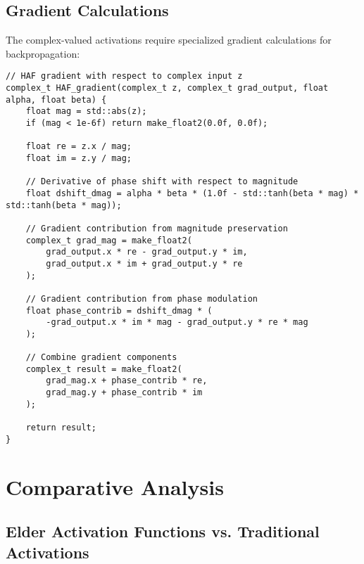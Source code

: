 \subsection{Gradient Calculations}

The complex-valued activations require specialized gradient calculations for backpropagation:

\begin{tcolorbox}[colback=CodeBackground, colframe=DarkGray, title=HAF Gradient Calculation, fonttitle=\bfseries]
\begin{verbatim}
// HAF gradient with respect to complex input z
complex_t HAF_gradient(complex_t z, complex_t grad_output, float alpha, float beta) {
    float mag = std::abs(z);
    if (mag < 1e-6f) return make_float2(0.0f, 0.0f);
    
    float re = z.x / mag;
    float im = z.y / mag;
    
    // Derivative of phase shift with respect to magnitude
    float dshift_dmag = alpha * beta * (1.0f - std::tanh(beta * mag) * std::tanh(beta * mag));
    
    // Gradient contribution from magnitude preservation
    complex_t grad_mag = make_float2(
        grad_output.x * re - grad_output.y * im,
        grad_output.x * im + grad_output.y * re
    );
    
    // Gradient contribution from phase modulation
    float phase_contrib = dshift_dmag * (
        -grad_output.x * im * mag - grad_output.y * re * mag
    );
    
    // Combine gradient components
    complex_t result = make_float2(
        grad_mag.x + phase_contrib * re,
        grad_mag.y + phase_contrib * im
    );
    
    return result;
}
\end{verbatim}
\end{tcolorbox}

\section{Comparative Analysis}

\subsection{Elder Activation Functions vs. Traditional Activations}

